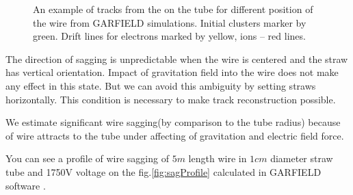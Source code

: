 \documentclass[]{article}
\begin{document}
	\begin{figure}[h!]
		\centering
		\qquad
		\caption{ An example of tracks from the on the tube for different position of the wire from GARFIELD simulations. Initial clusters marker by green. Drift lines for electrons marked by yellow, ions -- red lines.}	
	\end{figure}
	
	The direction of sagging is unpredictable when the wire is centered and the straw has vertical orientation. Impact of gravitation field into the wire does not make any effect in this state. But we can avoid this ambiguity by setting straws horizontally. This condition is necessary to make track reconstruction possible.
	
	We estimate significant wire sagging(by comparison to the tube radius) because of wire attracts to the tube under affecting of gravitation and electric field force.
	
	You can see a profile of wire sagging of $5m$ length wire in $1cm$ diameter straw tube and 1750V voltage on the fig.\ref{fig:sagProfile} calculated in GARFIELD software \cite{garfield}.
	
\end{document}
